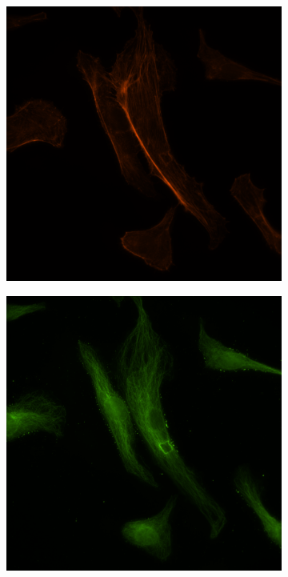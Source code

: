 \documentclass[12pt, a4paper]{article}
\begin{document}
\begin{figure}[H]
\centering
\begin{subfigure}{0.32\textwidth}
\includegraphics[width=\textwidth]{./Confocal/pEpi.png}
\end{subfigure}
\begin{subfigure}{0.32\textwidth}
\includegraphics[width=\textwidth]{./Confocal/zEpi.png}

\end{subfigure}
\end{figure}
\end{document}

